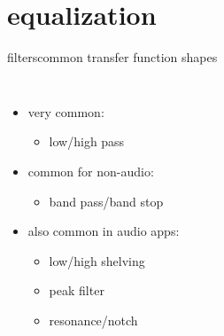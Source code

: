     \section{equalization}
	\begin{frame}{filters}{common transfer function shapes}

            \begin{columns}
            \begin{itemize}
                \item   very common:
                    \begin{itemize}
                        \item   low/high pass
                    \end{itemize}
                \smallskip
                \item<3->   common for non-audio:
                    \begin{itemize}
                        \item   band pass/band stop
                    \end{itemize}
                \smallskip
                \item<4->   also common in audio apps:
                    \begin{itemize}
                        \item<4->   low/high shelving
                        \item<5->   peak filter
                        \item<6->   resonance/notch
                    \end{itemize}
            \end{itemize}
                \vspace{-3mm}
            \end{columns}
    \end{frame}
